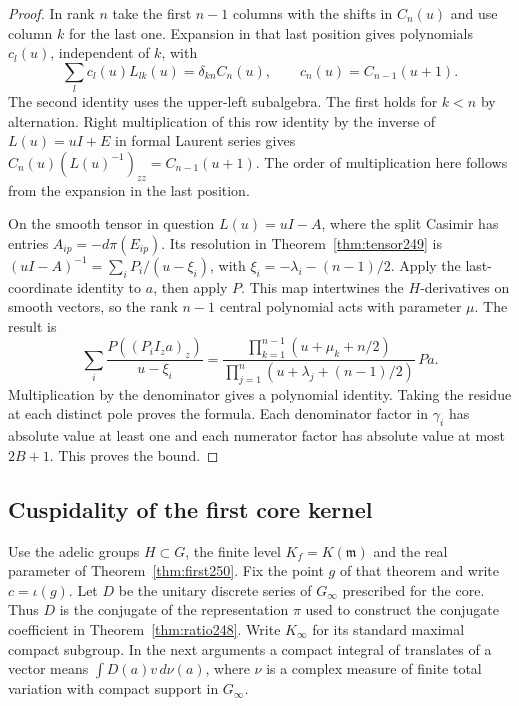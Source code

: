 \documentclass[a4paper,11pt]{article}
\theoremstyle{definition}
\theoremstyle{remark}
\numberwithin{equation}{section}
\begin{document}
\begin{proof}
In rank \(n\) take the first \(n-1\) columns with the shifts in
\(C_n(u)\) and use column \(k\) for the last one. Expansion in that
last position gives polynomials \(c_l(u)\), independent of \(k\), with
\[
 \sum_l c_l(u)L_{lk}(u)=\delta_{kn}C_n(u),\qquad
 c_n(u)= C_{n-1}(u+1).
\]
The second identity uses the upper-left subalgebra. The first holds
for \(k<n\) by alternation. Right multiplication of this row identity
by the inverse of \(L(u)=uI+E\) in formal Laurent series gives
\(C_n(u)(L(u)^{-1})_{zz}=C_{n-1}(u+1)\). The order of multiplication
here follows from the expansion in the last position.

On the smooth tensor in question \(L(u)=uI-A\), where the split
Casimir has entries \(A_{ip}=-d\pi(E_{ip})\). Its resolution in
Theorem~\ref{thm:tensor249} is \((uI-A)^{-1}=\sum_i P_i/(u-\xi_i)\),
with \(\xi_i=-\lambda_i-(n-1)/2\). Apply the last-coordinate
identity to \(a\), then apply \(P\). This map intertwines the
\(H\)-derivatives on smooth vectors, so the rank \(n-1\) central
polynomial acts with parameter \(\mu\). The result is
\[
 \sum_i\frac{P((P_i I_z a)_z)}{u-\xi_i}
 =\frac{\prod_{k=1}^{n-1}(u+\mu_k+n/2)}
         {\prod_{j=1}^n(u+\lambda_j+(n-1)/2)}\,Pa .
\]
Multiplication by the denominator gives a polynomial identity. Taking
the residue at each distinct pole proves the formula. Each denominator
factor in \(\gamma_i\) has absolute value at least one and each numerator
factor has absolute value at most \(2B+1\). This proves the bound.
\end{proof}

\subsection{Cuspidality of the first core kernel}\label{nav:IV-33}
Use the adelic groups \(H\subset G\), the finite level \(K_f=K(\mathfrak m)\)
and the real parameter of Theorem~\ref{thm:first250}. Fix the point \(g\) of
that theorem and write \(c=\iota(g)\). Let \(D\) be the unitary discrete
series of \(G_\infty\) prescribed for the core. Thus \(D\) is the conjugate of
the representation \(\pi\) used to construct the conjugate coefficient
in Theorem~\ref{thm:ratio248}. Write \(K_\infty\) for its standard maximal
compact subgroup. In the next arguments a compact integral of translates
of a vector means \(\int D(a)v\,d\nu(a)\), where \(\nu\) is a complex
measure of finite total variation with compact support in \(G_\infty\).
\end{document}
